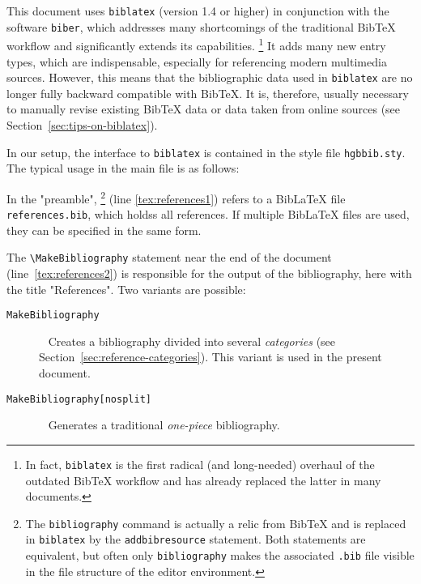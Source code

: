 This document uses \texttt{biblatex} (version 1.4 or higher) in conjunction with
the software \texttt{biber}, which addresses many shortcomings of the
traditional BibTeX workflow and significantly extends its capabilities.%
\footnote{In fact, \texttt{biblatex} is the first radical (and long-needed)
overhaul of the outdated BibTeX workflow and has already replaced the latter in
many documents.}
It adds many new entry types, which are indispensable, especially for
referencing modern multimedia sources. However, this means that the
bibliographic data used in \texttt{biblatex} are no longer fully backward
compatible with BibTeX. It is, therefore, usually necessary to manually revise
existing BibTeX data or data taken from online sources (see
Section~\ref{sec:tips-on-biblatex}).

In our setup, the interface to \texttt{biblatex} is contained in the style
file \nolinkurl{hgbbib.sty}. The typical usage in the main \latex file is as
follows:
%
%
In the "preamble",
\verb!!%
\footnote{The \texttt{{\bs}bibliography} command is actually a relic from BibTeX
and is replaced in \texttt{biblatex} by the \texttt{{\bs}addbibresource}
statement. Both statements are equivalent, but often only
\texttt{{\bs}bibliography} makes the associated \texttt{.bib} file visible in
the file structure of the editor environment.}
(line \ref{tex:references1}) refers to a BibLaTeX file \nolinkurl{references.bib},
which holdss all references.
If multiple BibLaTeX files are used, they can be specified in the same form.

The \verb!\MakeBibliography! statement near the end of the document
(line~\ref{tex:references2}) is responsible for the output of the bibliography,
here with the title "References". Two variants are possible:
%
\begin{description}
    \item[\texttt{{\bs}MakeBibliography}] ~ \newline
    Creates a bibliography divided into several \emph{categories} (see
    Section~\ref{sec:reference-categories}). This variant is used in the present
    document.
%
    \item[\texttt{{\bs}MakeBibliography[nosplit]}] ~ \newline
    Generates a traditional \emph{one-piece} bibliography.
\end{description}

